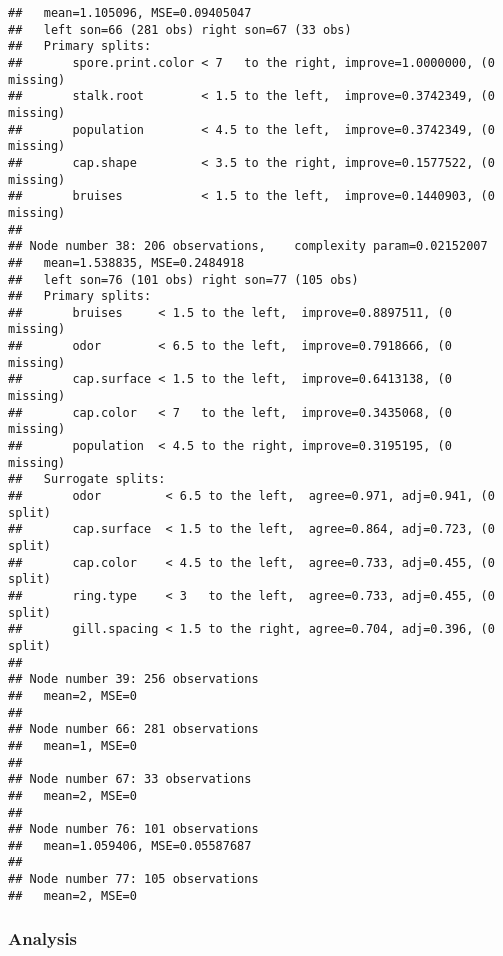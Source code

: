 \documentclass[
]{article}
\begin{document}
\begin{verbatim}
##   mean=1.105096, MSE=0.09405047 
##   left son=66 (281 obs) right son=67 (33 obs)
##   Primary splits:
##       spore.print.color < 7   to the right, improve=1.0000000, (0 missing)
##       stalk.root        < 1.5 to the left,  improve=0.3742349, (0 missing)
##       population        < 4.5 to the left,  improve=0.3742349, (0 missing)
##       cap.shape         < 3.5 to the right, improve=0.1577522, (0 missing)
##       bruises           < 1.5 to the left,  improve=0.1440903, (0 missing)
## 
## Node number 38: 206 observations,    complexity param=0.02152007
##   mean=1.538835, MSE=0.2484918 
##   left son=76 (101 obs) right son=77 (105 obs)
##   Primary splits:
##       bruises     < 1.5 to the left,  improve=0.8897511, (0 missing)
##       odor        < 6.5 to the left,  improve=0.7918666, (0 missing)
##       cap.surface < 1.5 to the left,  improve=0.6413138, (0 missing)
##       cap.color   < 7   to the left,  improve=0.3435068, (0 missing)
##       population  < 4.5 to the right, improve=0.3195195, (0 missing)
##   Surrogate splits:
##       odor         < 6.5 to the left,  agree=0.971, adj=0.941, (0 split)
##       cap.surface  < 1.5 to the left,  agree=0.864, adj=0.723, (0 split)
##       cap.color    < 4.5 to the left,  agree=0.733, adj=0.455, (0 split)
##       ring.type    < 3   to the left,  agree=0.733, adj=0.455, (0 split)
##       gill.spacing < 1.5 to the right, agree=0.704, adj=0.396, (0 split)
## 
## Node number 39: 256 observations
##   mean=2, MSE=0 
## 
## Node number 66: 281 observations
##   mean=1, MSE=0 
## 
## Node number 67: 33 observations
##   mean=2, MSE=0 
## 
## Node number 76: 101 observations
##   mean=1.059406, MSE=0.05587687 
## 
## Node number 77: 105 observations
##   mean=2, MSE=0
\end{verbatim}

\hypertarget{analysis}{%
\subsubsection{Analysis}\label{analysis}}
\end{document}
